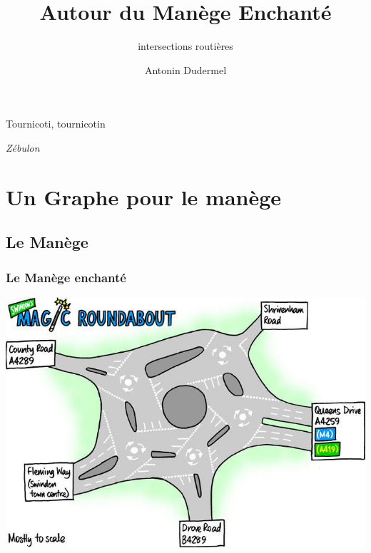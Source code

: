 \documentclass[slidetop,11pt]{beamer}
\title{Autour du Manège Enchanté}
\subtitle{intersections routières}
\date{}
\author{Antonin Dudermel}
\begin{document}

\frame{\titlepage}

\begin{frame}
	\epigraph{Tournicoti, tournicotin}{\it Zébulon}
\end{frame}

\begin{frame}
	\tableofcontents
\end{frame}

\section{Un Graphe pour le manège}
	\subsection{Le Manège}
\begin{frame}
	\frametitle{Le Manège enchanté}
	\begin{center}
		\includegraphics[scale=0.4]{./images/magic-brit}
	\end{center}
\end{frame}

\end{document}
